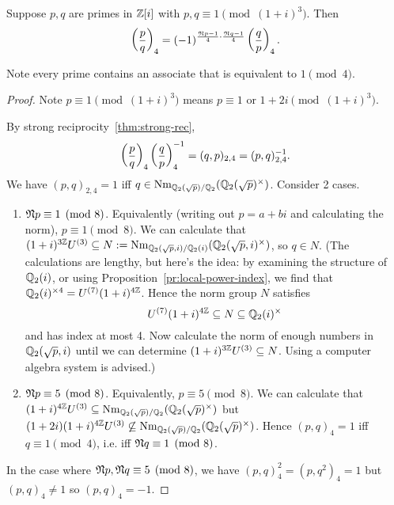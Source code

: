 \begin{thm}
Suppose $p,q$ are primes in $\mathbb{Z}[i]$ with $p,q\equiv 1\pmod{(1+i)^3}$. Then
\[
\left( {\frac{p}{q}} \right)_4=(-1)^{\frac{\mathfrak{N} p-1}{4}\cdot \frac{\mathfrak{N} q-1}{4}}\left( {\frac{q}{p}} \right)_4.
\]
\end{thm}
Note every prime contains an associate that is equivalent to $1\pmod{4}$.
\begin{proof}
Note $p\equiv 1\pmod{(1+i)^3}$ means $p\equiv1$ or $1+2i\pmod{(1+i)^3}$. 

By strong reciprocity~\ref{thm:strong-rec}, 
\[\left( {\frac{p}{q}} \right)_4\left( {\frac{q}{p}} \right)_4^{-1}=(q,p)_{2,4}=(p,q)_{2,4}^{-1}.\]
We have $(p,q)_{2,4}=1$ iff $q\in \operatorname{Nm}_{\mathbb{Q}_2(\sqrt p)/\mathbb{Q}_2}(\mathbb{Q}_2(\sqrt p)^{\times})$. %
Consider 2 cases.
\begin{enumerate}
\item $\mathfrak{N} p\equiv 1\pmod 8$. Equivalently (writing out $p=a+bi$ and calculating the norm), $p\equiv 1\pmod 8$. %
We can calculate %
that $(1+i)^{3\mathbb{Z}}U^{(3)}\subseteq N:=\operatorname{Nm}_{\mathbb{Q}_2(\sqrt p,i)/\mathbb{Q}_2(i)}(\mathbb{Q}_2(\sqrt p,i)^{\times})$, so $q\in N$. (The calculations are lengthy, but here's the idea: by examining the structure of $\mathbb{Q}_2(i)$, or using Proposition~\ref{pr:local-power-index}, we find that $\mathbb{Q}_2(i)^{\times 4}=U^{(7)}(1+i)^{4\mathbb{Z}}$. %
 Hence the norm group $N$ satisfies
\[
U^{(7)}(1+i)^{4\mathbb{Z}}\subseteq N\subseteq \mathbb{Q}_2(i)^{\times}
\]
and has index at most 4. 
Now calculate the norm of enough numbers in $\mathbb{Q}_2(\sqrt p,i)$ until we can determine $(1+i)^{3\mathbb{Z}}U^{(3)}\subseteq N$. Using a computer algebra system is advised.)
\item $\mathfrak{N} p\equiv 5\pmod 8$. Equivalently, $p\equiv 5\pmod 8$. We can calculate that $(1+i)^{4\mathbb{Z}}U^{(3)} \subseteq \operatorname{Nm}_{\mathbb{Q}_2(\sqrt p)/\mathbb{Q}_2}(\mathbb{Q}_2(\sqrt p)^{\times})$ but $(1+2i)(1+i)^{4\mathbb{Z}}U^{(3)} \not\subseteq \operatorname{Nm}_{\mathbb{Q}_2(\sqrt p)/\mathbb{Q}_2}(\mathbb{Q}_2(\sqrt p)^{\times})$. Hence $(p,q)_4=1$ iff $q\equiv 1\pmod 4$, i.e. iff $\mathfrak{N} q\equiv 1\pmod 8$.
\end{enumerate}
In the case where $\mathfrak{N} p,\mathfrak{N} q\equiv 5\pmod 8$, we have $(p,q)_4^2=(p,q^2)_4=1$ but $(p,q)_4\neq 1$ so $(p,q)_4=-1$.
\end{proof}

